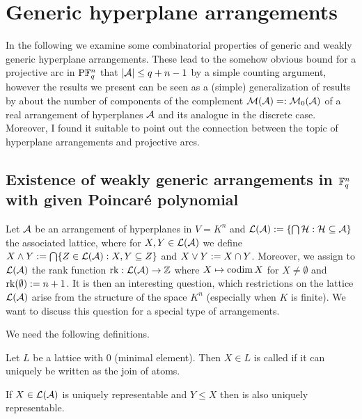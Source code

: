 \section{Generic hyperplane arrangements}
\makeatletter%
\def\@currentlabel{Section \thesection}%
\makeatother%
\label{sec-gen-hyperplane-arr}

In the following we examine some combinatorial properties of generic and weakly generic hyperplane arrangements.
These lead to the somehow obvious bound for a projective arc in $\P \field{q}^n$ that $\left\vert{\mathcal{A}}\right\vert\leq q+n-1$ by a simple counting argument, however the results we present can be seen as a (simple) generalization of results by  about the number of components of the complement $\mathcal{M}(\mathcal{A})=:\mathcal{M}_0(\mathcal{A})$ of a real arrangement of hyperplanes $\mathcal{A}$ and its analogue in the discrete case.
Moreover, I found it suitable to point out the connection between the topic of hyperplane arrangements and projective arcs.

\subsection{Existence of weakly generic arrangements in $\mathbb{F}_{q}^n$ with given Poincaré polynomial}

Let $\mathcal{A}$ be an arrangement of hyperplanes in $V=K^n$ and $\mathcal{L}(\mathcal{A}):=\{\bigcap \mathcal{H}:\mathcal{H}\subseteq \mathcal{A}\}$ the associated lattice, where for $X,Y\in\mathcal{L}(\mathcal{A})$ we define $X\wedge Y:=\bigcap\{Z\in\mathcal{L}(\mathcal{A}):X,Y\subseteq Z\}$ and $X\vee Y:= X\cap Y$.
Moreover, we assign to $\mathcal{L}(\mathcal{A})$ the rank function $\mathop{\mathrm{rk}}\nolimits:\mathcal{L}(\mathcal{A})\rightarrow \mathbb{Z}$ where $X\mapsto \mathop\mathrm{codim} X$ for $X\neq \emptyset$ and $\mathop{\mathrm{rk}}\nolimits(\emptyset):=n+1$.
It is then an interesting question, which restrictions on the lattice $\mathcal{L}(\mathcal{A})$ arise from the structure of the space $K^n$ (especially when $K$ is finite). We want to discuss this question for a special type of arrangements.

We need the following definitions.

\begin{definition} 
    Let $L$ be a lattice with $0$ (minimal element). Then $X\in L$ is called  if it can uniquely be written as the join of atoms.
\end{definition}

\begin{remark}
    If $X\in\mathcal{L}(\mathcal{A})$ is uniquely representable and $Y\leq X$ then is also uniquely representable. 
\end{remark}

